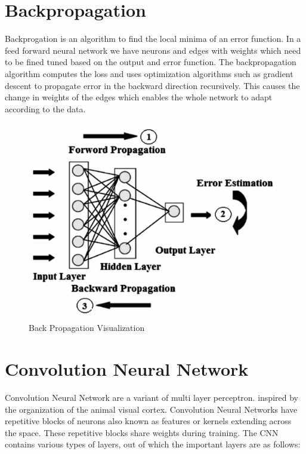 \section{Backpropagation}
 Backprogation\cite{rumelhart1988learning} is an algorithm to find the local minima of an error function. In a feed forward neural network we have neurons and edges with weights which need to be fined tuned based on the output and error function.  The backpropagation algorithm computes the loss and uses  optimization algorithms such as gradient descent to propagate error in the backward direction recursively. This causes the change in weights of the edges which enables the whole network to adapt according to the data.  
\begin{figure}[H]
  \centering
    \includegraphics[scale=.4, angle=0]{Files/BackPropagation.png}
    \caption[Back Propagation Visualization]{Back Propagation Visualization}
    \label{fig:backpropogation}
\end{figure}

\section{Convolution Neural Network}

Convolution Neural Network are a variant of multi layer perceptron. inspired by the organization of the animal visual cortex. Convolution Neural Networks have repetitive blocks of neurons also known as features or kernels extending across the space. These repetitive blocks share weights during training. The CNN contains various types of layers, out of which the important layers are  as follows:

